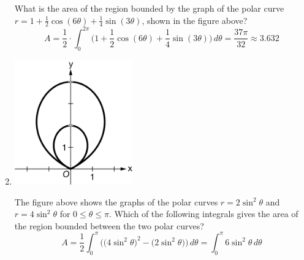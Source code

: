 \documentclass[12pt]{article}
\begin{document}
\begin{enumerate}
\begin{center}
	      \end{center}
	      What is the area of the region bounded by the graph of the polar curve $r= 1 + \frac{1}{2}\cos(6\theta) + \frac{1}{4} \sin(3\theta)$, shown in the figure above?
	      $$A=\frac{1}{2} \cdot\int_{0}^{2\pi} \bigg(1 + \frac{1}{2}\cos(6\theta) + \frac{1}{4} \sin(3\theta)\bigg) \, d\theta = \frac{37\pi}{32} \approx \boxed{3.632}$$
	\item 
	      \begin{center}
	      	\includegraphics[width=2in]{7.037}
	      \end{center}      
	      The figure above shows the graphs of the polar curves $r=2\sin^2\theta$ and $r=4\sin^2\theta$ for $0\leq \theta\leq\pi$. Which of the following integrals gives the area of the region bounded between the two polar curves?
	      $$A = \frac{1}{2} \int_{0}^{\pi} \bigg(\big(4\sin^2\theta\big)^2 - \big(2\sin^2\theta\big)\bigg)\, d\theta  = \boxed{\int_{0}^{\pi} 6\sin^2\theta \, d\theta}$$
\end{enumerate}
\end{document}
